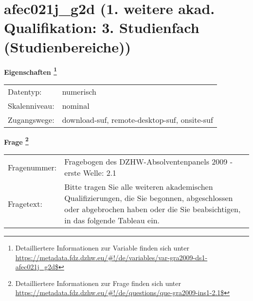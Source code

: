 
    \setcounter{footnote}{0}

    \vspace*{-1.8cm}
	\section{afec021j\_g2d (1. weitere akad. Qualifikation: 3. Studienfach (Studienbereiche))}
	\label{section:afec021j_g2d}



    \vspace*{0.5cm}
    \noindent\textbf{Eigenschaften
	\footnote{Detailliertere Informationen zur Variable finden sich unter
		\url{https://metadata.fdz.dzhw.eu/\#!/de/variables/var-gra2009-ds1-afec021j_g2d$}}}\\
	\begin{tabularx}{\hsize}{@{}lX}
	Datentyp: & numerisch \\
	Skalenniveau: & nominal \\
	Zugangswege: &
	  download-suf, 
	  remote-desktop-suf, 
	  onsite-suf
 \\
    \end{tabularx}



				\vspace*{0.5cm}
                \noindent\textbf{Frage
	                \footnote{Detailliertere Informationen zur Frage finden sich unter
		              \url{https://metadata.fdz.dzhw.eu/\#!/de/questions/que-gra2009-ins1-2.1$}}}\\
				\begin{tabularx}{\hsize}{@{}lX}
					Fragenummer: &
					  Fragebogen des DZHW-Absolventenpanels 2009 - erste Welle:
					  2.1
 \\
					Fragetext: & Bitte tragen Sie alle weiteren akademischen Qualifizierungen, die Sie begonnen, abgeschlossen oder abgebrochen haben oder die Sie beabsichtigen, in das folgende Tableau ein. \\
				\end{tabularx}





